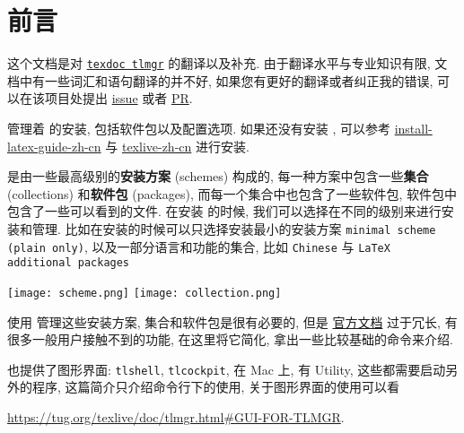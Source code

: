 \section*{前\quad 言}

这个文档是对 \href{https://mirrors.ctan.org/info/tlmgrbasics/doc/tlmgr.pdf}{\texttt{texdoc tlmgr}} 的翻译以及补充. 由于翻译水平与专业知识有限, 文档中有一些词汇和语句翻译的并不好, 如果您有更好的翻译或者纠正我的错误, 可以在该项目处提出 \href{https://github.com/syvshc/tlmgr-intro-zh-cn/issues}{issue} 或者 \href{https://github.com/syvshc/tlmgr-intro-zh-cn/pulls}{PR}. 

\tlmgr 管理着 \tl 的安装, 包括软件包以及配置选项. 如果还没有安装 \tl, 可以参考 \href{https://mirrors.ctan.org/info/install-latex-guide-zh-cn/install-latex-guide-zh-cn.pdf}{install-latex-guide-zh-cn} 与 \href{https://www.tug.org/texlive/doc/texlive-zh-cn/texlive-zh-cn.pdf}{texlive-zh-cn} 进行安装. 

\tl 是由一些最高级别的\textbf{安装方案} (schemes) 构成的, 每一种方案中包含一些\textbf{集合} (collections) 和\textbf{软件包} (packages), 而每一个集合中也包含了一些软件包, 软件包中包含了一些可以看到的文件. 在安装 \tl 的时候, 我们可以选择在不同的级别来进行安装和管理. 比如在安装的时候可以只选择安装最小的安装方案 \texttt{minimal scheme (plain only)}, 以及一部分语言和功能的集合, 比如 \texttt{Chinese} 与 \texttt{LaTeX additional packages}

\begin{center}
    \texttt{[image: scheme.png]} \quad 
    \texttt{[image: collection.png]}
\end{center}

使用 \tlmgr 管理这些安装方案, 集合和软件包是很有必要的, 但是 \href{https://www.tug.org/texlive/doc/tlmgr.html}{\tlmgr 官方文档} 过于冗长, 有很多一般用户接触不到的功能, 在这里将它简化, 拿出一些比较基础的命令来介绍. 

\tlmgr 也提供了图形界面: \texttt{tlshell}, \texttt{tlcockpit}, 在 Mac 上, 有 \tl{} Utility, 这些都需要启动另外的程序, 这篇简介只介绍命令行下的使用, 关于图形界面的使用可以看
\begin{center}
    \url{https://tug.org/texlive/doc/tlmgr.html#GUI-FOR-TLMGR}.
\end{center}
